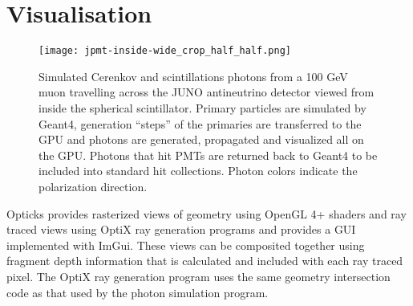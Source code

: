 \documentclass[a4paper]{jpconf}
\begin{document}


\section{Visualisation}

\begin{figure}[htbp]
\centering
\texttt{[image: jpmt-inside-wide\_crop\_half\_half.png]}
\caption{Simulated Cerenkov and scintillations photons from a 100 GeV muon travelling
across the JUNO antineutrino detector viewed from inside the spherical scintillator.
Primary particles are simulated by Geant4, generation ``steps'' of the primaries
are transferred to the GPU and photons are generated, propagated and visualized
all on the GPU. Photons that hit PMTs
are returned back to Geant4 to be included into standard hit collections.
Photon colors indicate the polarization direction.}
\end{figure}







Opticks provides rasterized views of geometry using OpenGL 4+ shaders
and ray traced views using OptiX ray generation programs and provides 
a GUI implemented with ImGui\cite{ImGui}.
These views can be composited together using fragment depth information 
that is calculated and included with each ray traced pixel.
The OptiX ray generation program uses the same geometry intersection 
code as that used by the photon simulation program.  
\end{document}
